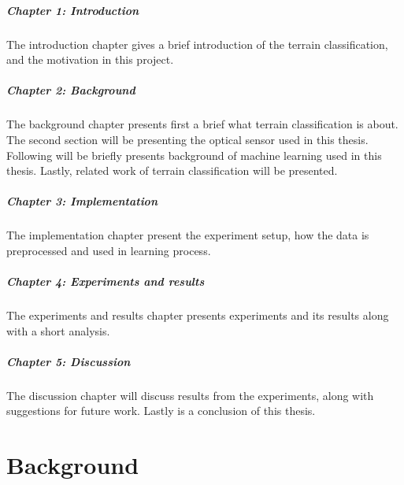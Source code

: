 \documentclass[USenglish]{ifimaster}  %
\begin{document}
\paragraph{Chapter 1: Introduction}
The introduction chapter gives a brief introduction of the terrain classification, and the motivation in this project.
	
\paragraph{Chapter 2: Background}
The background chapter presents first a brief what terrain classification is about. The second section will be presenting the optical sensor used in this thesis. Following will be briefly presents background of machine learning used in this thesis. Lastly, related work of terrain classification will be presented.
	
\paragraph{Chapter 3: Implementation}
The implementation chapter present the experiment setup, how the data is preprocessed and used in learning process.
	
\paragraph{Chapter 4: Experiments and results}
The experiments and results chapter presents experiments and its results along with a short analysis.
	
\paragraph{Chapter 5: Discussion}
The discussion chapter will discuss results from the experiments, along with suggestions for future work. Lastly is a conclusion of this thesis. 
	
	
\chapter{Background}                  %
\end{document}

